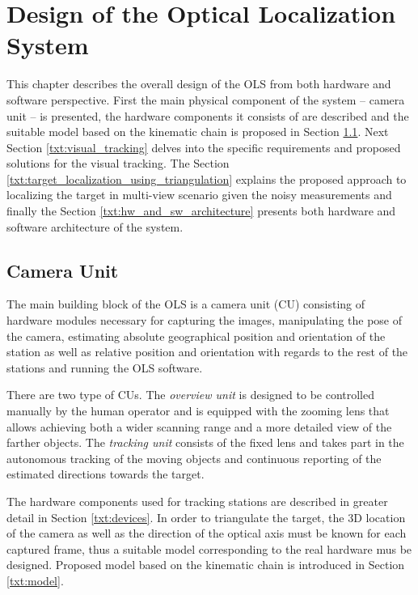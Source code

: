 \chapter{Design of the Optical Localization System} \label{txt:design_of_the_OLS}

This chapter describes the overall design of the OLS from both hardware and software perspective. First the main physical component of the system -- camera unit -- is presented, the hardware components it consists of are described and the suitable model based on the kinematic chain is proposed in Section \ref{txt:camera_unit}. Next Section \ref{txt:visual_tracking} delves into the specific requirements and proposed solutions for the visual tracking. The Section \ref{txt:target_localization_using_triangulation} explains the proposed approach to localizing the target in multi-view scenario given the noisy measurements and finally the Section \ref{txt:hw_and_sw_architecture} presents both hardware and software architecture of the system.

\section{Camera Unit} \label{txt:camera_unit}

The main building block of the OLS is a camera unit (CU) consisting of hardware modules necessary for capturing the images, manipulating the pose of the camera, estimating absolute geographical position and orientation of the station as well as relative position and orientation with regards to the rest of the stations and running the OLS software.

There are two type of CUs. The \textit{overview unit} is designed to be controlled manually by the human operator and is equipped with the zooming lens that allows achieving both a wider scanning range and a more detailed view of the farther objects. The \textit{tracking unit} consists of the fixed lens and takes part in the autonomous tracking of the moving objects and continuous reporting of the estimated directions towards the target.

The hardware components used for tracking stations are described in greater detail in Section \ref{txt:devices}. In order to triangulate the target, the 3D location of the camera as well as the direction of the optical axis must be known for each captured frame, thus a suitable model corresponding to the real hardware mus be designed. Proposed model based on the kinematic chain is introduced in Section \ref{txt:model}.

